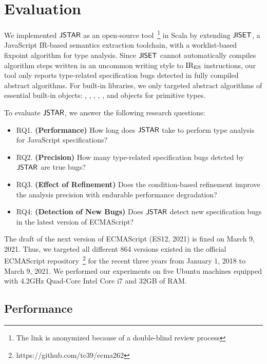 \section{Evaluation}\label{sec:eval}

We implemented $\tool$ as an open-source tool~\footnote{The link is anonymized
because of a double-blind review process} in Scala by extending $\jiset$, a
JavaScript IR-based semantics extraction toolchain, with a worklist-based
fixpoint algorithm for type analysis.  Since $\jiset$ cannot automatically
compiles algorithm steps written in an uncommon writing style to ${\text{IR}_\text{ES}}$
instructions, our tool only reports type-related specification bugs detected in
fully compiled abstract algorithms.  For built-in libraries, we only targeted
abstract algorithms of essential built-in objects: ,
, , , , and objects
for primitive types.

To evaluate $\tool$, we answer the following research questions:
\begin{itemize}
  \item RQ1. \textbf{(Performance)} How long does $\tool$ take to perform type
    analysis for JavaScript specifications?
  \item RQ2. \textbf{(Precision)} How many type-related specification bugs
    detcted by $\tool$ are true bugs?
  \item RQ3. \textbf{(Effect of Refinement)} Does the condition-based refinement
    improve the analysis precision with endurable performance degradation?
  \item RQ4: \textbf{(Detection of New Bugs)} Does $\tool$ detect new
    specification bugs in the latest version of ECMAScript?
\end{itemize}
The draft of the next version of ECMAScript (ES12, 2021) is fixed on March 9,
2021.  Thus, we targeted all different 864 versions existed in the official
ECMAScript repository~\footnote{https://github.com/tc39/ecma262} for the recent
three years from January 1, 2018 to March 9, 2021.  We performed our experiments
on five Ubuntu machines equipped with 4.2GHz Quad-Core Intel Core i7 and 32GB of
RAM.


\subsection{Performance}\label{sec:performance}

